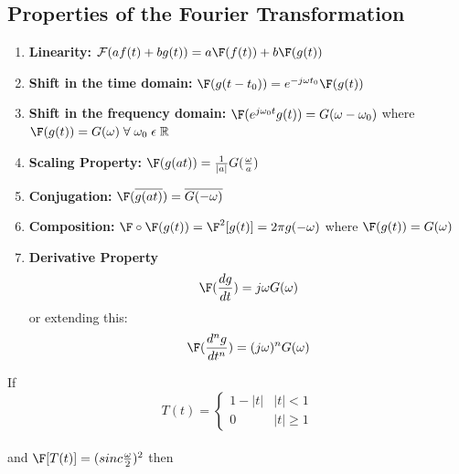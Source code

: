 \documentclass[11pt]{article}
\theoremstyle{definition}
\newcommand{\R}{\mathbb{R}}
\begin{document}
\subsection{Properties of the Fourier Transformation}
\begin{enumerate}
    \item \textbf{Linearity:} $\mathcal{F}(af(t) + bg(t)) = a\F (f(t)) + b\F (g(t))$
    \item \textbf{Shift in the time domain:} $\F (g(t-t_0)) = e^{-j\omega t_0}\F (g(t))$
    \item \textbf{Shift in the frequency domain:} $\F(e^{j\omega_0 t}g(t)) = G(\omega - \omega_0)$ where $\F (g(t))= G(\omega)\; \forall\; \omega_0\; \epsilon\; \R$
    \item \textbf{Scaling Property:} $\F (g(at)) = \frac{1}{|a|}G(\frac{\omega}{a})$
    \item \textbf{Conjugation:} $\F (\overline{g(at)}) = \overline{G(-\omega)}$
    \item \textbf{Composition:} $\F \circ \F(g(t)) = \F^2[g(t)] =  2\pi g(-\omega)$ where $\F (g(t))= G(\omega)$
    \item \textbf{Derivative Property} $$\F(\frac{dg}{dt}) = j\omega G(\omega)$$ or extending this:
    $$\F(\frac{d^ng}{dt^n}) = (j\omega)^n G(\omega)$$
\end{enumerate}
\newpage
If
\[T(t) =  \begin{cases}
      1-|t| & |t| < 1 \\
      0 & |t| \geq 1
   \end{cases}
\]\\ and $\F[T(t)] = (sinc\frac{\omega}{2})^2$
then
\end{document}
